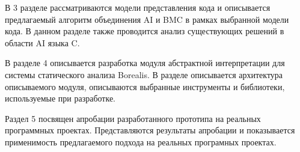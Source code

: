 В 3 разделе рассматриваются модели представления кода и описывается предлагаемый 
алгоритм объединения AI и BMC в рамках выбранной модели кода. В данном разделе
также проводится анализ существующих решений в области AI языка C.

В разделе 4 описывается разработка модуля абстрактной интерпретации для системы 
статического анализа Borealis. В разделе описывается архитектура описываемого 
модуля, описываются выбранные инструменты и библиотеки, используемые при 
разработке.

Раздел 5 посвящен апробации разработанного прототипа на реальных программных 
проектах. Представляются результаты апробации и показывается применимость
предлагаемого подхода на реальных програмных проектах.